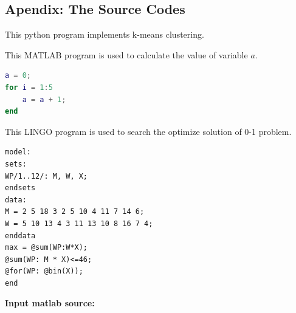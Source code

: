 \documentclass[11pt]{article}
\begin{document}
\clearpage
\begin{subappendices}						%
\section*{Apendix: The Source Codes}		%

This python program implements k-means clustering.


This MATLAB program is used to calculate the value of variable $a$.
\begin{lstlisting}[language={Matlab}, caption=\texttt{temp.m}]
a = 0;
for i = 1:5
	a = a + 1;
end
\end{lstlisting}

This LINGO program is used to search the optimize solution of 0-1 problem.
\begin{lstlisting}[language=Lingo, caption=\texttt{temp.lg4}]
model:
sets:
WP/1..12/: M, W, X;
endsets
data:
M = 2 5 18 3 2 5 10 4 11 7 14 6;
W = 5 10 13 4 3 11 13 10 8 16 7 4;
enddata
max = @sum(WP:W*X);
@sum(WP: M * X)<=46;
@for(WP: @bin(X));
end
\end{lstlisting}

\textbf{\textcolor[rgb]{0.98,0.00,0.00}{Input matlab source:}}
% 

\end{subappendices}
\end{document}
